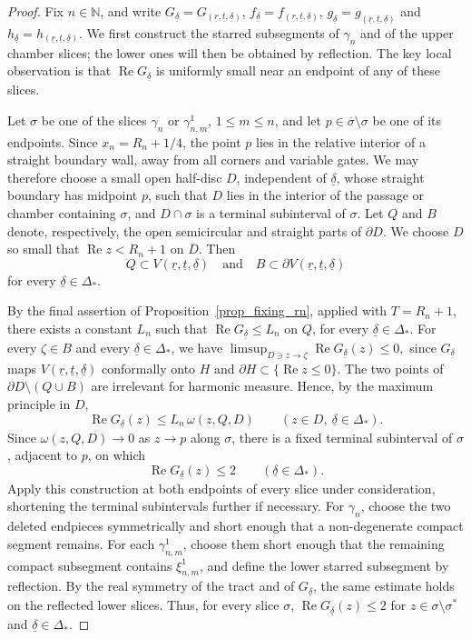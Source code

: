\documentclass[a4paper, 11pt, reqno]{amsart}
\numberwithin{equation}{section}
\theoremstyle{plain}
\theoremstyle{remark}
\newcommand{\N}{{\mathbb{N}}}
\newcommand{\uldelta}{\underline{\delta}}
\newcommand{\ulr}{\underline{r}}
\newcommand{\ult}{\underline{t}}
\newcommand{\Rea}{\operatorname{Re }}
\begin{document}
\begin{proof}
		Fix \(n\in\N\), and write \(G_{\uldelta}=G_{(\ulr,\ult,\uldelta)}\), \(f_{\uldelta}=f_{(\ulr,\ult,\uldelta)}\), \(g_{\uldelta}=g_{(\ulr,\ult,\uldelta)}\) and \(h_{\uldelta}=h_{(\ulr,\ult,\uldelta)}\). We first construct the starred subsegments of \(\gamma_n\) and of the upper chamber slices; the lower ones will then be obtained by reflection. The key local observation is that \(\Rea G_{\uldelta}\) is uniformly small near an endpoint of any of these slices.
		
				Let \(\sigma\) be one of the slices \(\gamma_n\) or \(\gamma^1_{n,m}\), \(1\leq m\leq n\), and let \(p\in\overline{\sigma}\setminus\sigma\) be one of its endpoints. Since \(x_n=R_n+1/4\), the point \(p\) lies in the relative interior of
					a straight boundary wall, away from all corners and variable gates. We may
					therefore choose a small open half-disc \(D\), independent of \(\uldelta\),
					whose straight boundary has midpoint \(p\), such that \(D\) lies in the
					interior of the passage or chamber containing \(\sigma\), and
					\(D\cap\sigma\) is a terminal subinterval of \(\sigma\). Let \(Q\) and \(B\)
					denote, respectively, the open semicircular and straight parts of
					\(\partial D\). We choose \(D\) so small that \(\Rea z<R_n+1\) on
					\(\overline D\). Then
					\[
					Q\subset V(\ulr,\ult,\uldelta)
					\quad\text{and}\quad
					B\subset\partial V(\ulr,\ult,\uldelta)
					\]
					for every \(\uldelta\in\Delta_*\).

			By the final assertion of Proposition~\ref{prop_fixing_rn}, applied with
		\(T=R_n+1\), there exists a constant \(L_n\) such that
		$
		\Rea G_{\uldelta}\le L_n$ on $Q$,
		for every \(\uldelta\in\Delta_*\). For every \(\zeta\in B\) and every \(\uldelta\in\Delta_*\), we have
	$
	\limsup_{D\ni z\to\zeta}\Rea G_{\uldelta}(z)\leq0,
	$
	since \(G_{\uldelta}\) maps \(V(\ulr,\ult,\uldelta)\) conformally onto
	\(H\) and \(\partial H\subset\{\Rea z\leq0\}\). The two points of
	\(\partial D\setminus(Q\cup B)\) are irrelevant for harmonic measure. Hence, by the maximum
			principle in \(D\),
			\[
			\Rea G_{\uldelta}(z)
			\leq
			L_n\,\omega(z,Q,D)
			\qquad
			(z\in D,\ \uldelta\in\Delta_*).
			\]
			Since \(\omega(z,Q,D)\to0\) as \(z\to p\) along \(\sigma\), there is
				a fixed terminal subinterval of \(\sigma\), adjacent to \(p\), on which
				\[
				\Rea G_{\uldelta}(z)\leq2
				\qquad (\uldelta\in\Delta_*).\]
	Apply this construction at both endpoints of every slice under
		consideration, shortening the terminal subintervals further if necessary.
		For \(\gamma_n\), choose the two deleted endpieces symmetrically and short
		enough that a non-degenerate compact segment remains. For each
		\(\gamma^1_{n,m}\), choose them short enough that the remaining compact
		subsegment contains \(\xi^1_{n,m}\), and define the lower starred
		subsegment by reflection. By the real symmetry of the tract and of
		\(G_{\uldelta}\), the same estimate holds on the reflected lower slices.
		Thus, for every slice \(\sigma\), $\Rea G_{\uldelta}(z)\leq2$ for $z\in\sigma\setminus\sigma^*$ and $\uldelta\in\Delta_*$.
	

\end{proof}
\end{document}
